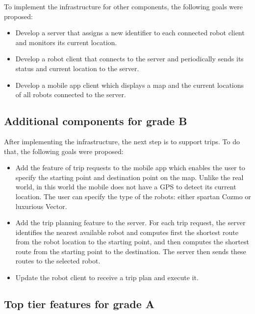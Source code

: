\documentclass[12pt,a4paper]{article}
\begin{document}
To implement the infrastructure for other components, the following goals were proposed: 

\begin{itemize}
\item Develop a server that assigns a new identifier to each connected robot client and monitors its current location.

\item Develop a robot client that connects to the server and periodically sends its status and current location to the server.

\item Develop a mobile app client which displays a map and the current locations of all robots connected to the server.
\end{itemize}
\subsection{Additional components for grade B} \label{sec:B}

After implementing the infrastructure, the next step is to support trips. To do that, the following goals  were proposed:

\begin{itemize}
\item Add the feature of trip requests to the mobile app which enables the user to specify the starting point and destination point on the map. Unlike the real world, in this world the mobile does not have a GPS to detect its current location. The user can specify the type of the robots: either spartan Cozmo or luxurious Vector. 

\item Add the trip planning feature to the server. For each trip request, the server identifies the nearest available robot and computes first the shortest route from the robot location to the  starting point, and then computes the shortest route from the starting point to the destination. The server then sends these routes to the selected robot.

\item Update the robot client to receive a trip plan and execute it.

\end{itemize}

\subsection{Top tier features for grade A} \label{sec:A}
\end{document}
